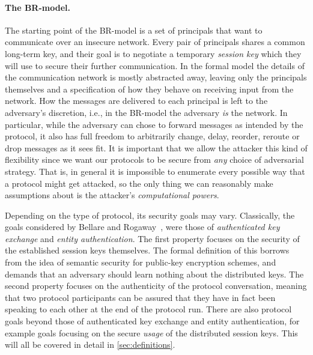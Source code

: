 \paragraph{The BR-model.}
The starting point of the BR-model is a set of principals that want to communicate over an insecure network.
Every pair of principals shares a common long-term key,
and their goal is to negotiate a temporary \emph{session key} which they will use to secure their further communication.
In the formal model the details of the communication network is mostly abstracted away,
leaving only the principals themselves and a specification of how they behave on receiving input from the network.
How the messages are delivered to each principal is left to the adversary's discretion,
i.e., in the BR-model the adversary \emph{is} the network.
In particular,
while the adversary can chose to forward messages as intended by the protocol,
it also has full freedom to arbitrarily change, delay, reorder, reroute or  drop messages as it sees fit.
It is important that we allow the attacker this kind of flexibility since we want our protocols to be secure from \emph{any} choice of adversarial strategy.
That is,
in general it is impossible to enumerate every possible way that a protocol might get attacked,
so the only thing we can reasonably make assumptions about is the attacker's \emph{computational powers}.

Depending on the type of protocol,
its security goals may vary.
Classically,
the goals considered by Bellare and Rogaway~\cite{C:BelRog93},
were those of \emph{authenticated key exchange} and \emph{entity authentication}.
The first property focuses on the security of the established session keys themselves.
The formal definition of this borrows from the idea of semantic security for public-key encryption schemes,
and demands that an adversary should learn nothing about the distributed keys.
The second property focuses on the authenticity of the protocol conversation,
meaning that two protocol participants can be assured that they have in fact been speaking to each other at the end of the protocol run.
There are also protocol goals beyond those of authenticated key exchange and entity authentication,
for example goals focusing on the secure \emph{usage} of the distributed session keys.
This will all be covered in  detail in \cref{sec:definitions}.



